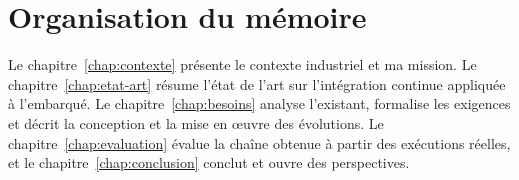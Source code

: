\section{Organisation du mémoire}
\label{sec:intro-plan}

Le chapitre~\ref{chap:contexte} présente le contexte industriel et ma mission.
Le chapitre~\ref{chap:etat-art} résume l'état de l'art sur l'intégration
continue appliquée à l'embarqué. Le chapitre~\ref{chap:besoins} analyse
l'existant, formalise les exigences et décrit la conception et la mise en œuvre
des évolutions. Le chapitre~\ref{chap:evaluation} évalue la chaîne obtenue à
partir des exécutions réelles, et le chapitre~\ref{chap:conclusion} conclut et
ouvre des perspectives.